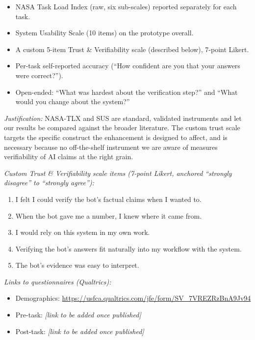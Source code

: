 \begin{itemize}
    \item NASA Task Load Index (raw, six sub-scales) reported separately for each task.
    \item System Usability Scale (10 items) on the prototype overall.
    \item A custom 5-item Trust \& Verifiability scale (described below), 7-point Likert.
    \item Per-task self-reported accuracy (``How confident are you that your answers were correct?'').
    \item Open-ended: ``What was hardest about the verification step?'' and ``What would you change about the system?''
\end{itemize}

\textit{Justification:} NASA-TLX and SUS are standard, validated instruments and let our results be compared against the broader literature. The custom trust scale targets the specific construct the enhancement is designed to affect, and is necessary because no off-the-shelf instrument we are aware of measures verifiability of AI claims at the right grain.

\textit{Custom Trust \& Verifiability scale items (7-point Likert, anchored ``strongly disagree'' to ``strongly agree''):}
\begin{enumerate}
    \item I felt I could verify the bot's factual claims when I wanted to.
    \item When the bot gave me a number, I knew where it came from.
    \item I would rely on this system in my own work.
    \item Verifying the bot's answers fit naturally into my workflow with the system.
    \item The bot's evidence was easy to interpret.
\end{enumerate}

\textit{Links to questionnaires (Qualtrics):}

\begin{itemize}
    \item Demographics: \url{https://usfca.qualtrics.com/jfe/form/SV_7VREZRzBnA9Jv94}
    \item Pre-task: \textit{[link to be added once published]}
    \item Post-task: \textit{[link to be added once published]}
\end{itemize}

